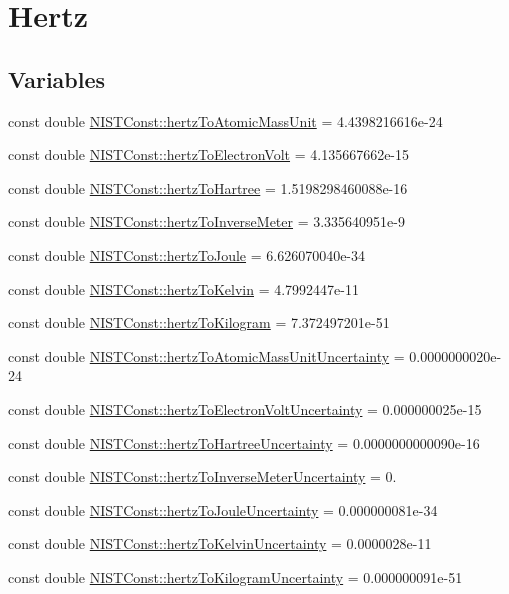 \hypertarget{group___hertz}{}\section{Hertz}
\label{group___hertz}
\subsection*{Variables}
\begin{DoxyCompactItemize}
\item 
const double \hyperlink{group___hertz_ga5e2fd7ea13ae13a34435ff0578082d34}{N\+I\+S\+T\+Const\+::hertz\+To\+Atomic\+Mass\+Unit} = 4.\+4398216616e-\/24
\item 
const double \hyperlink{group___hertz_ga035f43de5d8ad8208675c53a0057d14d}{N\+I\+S\+T\+Const\+::hertz\+To\+Electron\+Volt} = 4.\+135667662e-\/15
\item 
const double \hyperlink{group___hertz_ga2ededb8b750b44cde6d83c1c07b6a870}{N\+I\+S\+T\+Const\+::hertz\+To\+Hartree} = 1.\+5198298460088e-\/16
\item 
const double \hyperlink{group___hertz_ga6d5ccd7fed8ad7f2abb5c368565a1666}{N\+I\+S\+T\+Const\+::hertz\+To\+Inverse\+Meter} = 3.\+335640951e-\/9
\item 
const double \hyperlink{group___hertz_ga827c4e99287fcd5363fabcfe1381cc37}{N\+I\+S\+T\+Const\+::hertz\+To\+Joule} = 6.\+626070040e-\/34
\item 
const double \hyperlink{group___hertz_gacda137a5d10ebba59b340d770802678f}{N\+I\+S\+T\+Const\+::hertz\+To\+Kelvin} = 4.\+7992447e-\/11
\item 
const double \hyperlink{group___hertz_ga7b63758ab74cb80c236d4eacd5b89484}{N\+I\+S\+T\+Const\+::hertz\+To\+Kilogram} = 7.\+372497201e-\/51
\item 
const double \hyperlink{group___hertz_ga7ec0e57b96db2ded3c361465c8770d71}{N\+I\+S\+T\+Const\+::hertz\+To\+Atomic\+Mass\+Unit\+Uncertainty} = 0.\+0000000020e-\/24
\item 
const double \hyperlink{group___hertz_ga695a041e052cf0684ddbf956b7b8df80}{N\+I\+S\+T\+Const\+::hertz\+To\+Electron\+Volt\+Uncertainty} = 0.\+000000025e-\/15
\item 
const double \hyperlink{group___hertz_gaa2e1f37030bea54753040b6728792d90}{N\+I\+S\+T\+Const\+::hertz\+To\+Hartree\+Uncertainty} = 0.\+0000000000090e-\/16
\item 
const double \hyperlink{group___hertz_ga4a12fd74059017b7f715ed732182c47b}{N\+I\+S\+T\+Const\+::hertz\+To\+Inverse\+Meter\+Uncertainty} = 0.
\item 
const double \hyperlink{group___hertz_ga6fde96f31fcfe10060d6996d0d5ff117}{N\+I\+S\+T\+Const\+::hertz\+To\+Joule\+Uncertainty} = 0.\+000000081e-\/34
\item 
const double \hyperlink{group___hertz_gacdec68d8c592492309f427551ae82a21}{N\+I\+S\+T\+Const\+::hertz\+To\+Kelvin\+Uncertainty} = 0.\+0000028e-\/11
\item 
const double \hyperlink{group___hertz_gab0659e6441271775cddea1c3bef17708}{N\+I\+S\+T\+Const\+::hertz\+To\+Kilogram\+Uncertainty} = 0.\+000000091e-\/51
\end{DoxyCompactItemize}


